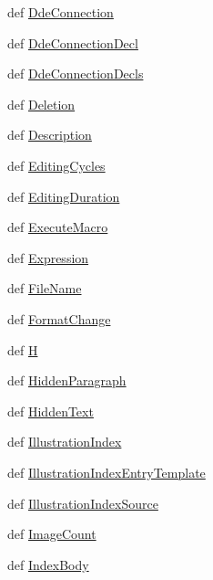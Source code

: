 \begin{DoxyCompactItemize}
\item 
def \hyperlink{namespaceodf_1_1text_abeff50d603209c35dc1520cbd65b8f38}{Dde\+Connection}
\item 
def \hyperlink{namespaceodf_1_1text_a1aa2c9df462089664933dbbe26faf718}{Dde\+Connection\+Decl}
\item 
def \hyperlink{namespaceodf_1_1text_a9f4c45586f94c7cbad71913aded59f4c}{Dde\+Connection\+Decls}
\item 
def \hyperlink{namespaceodf_1_1text_a3d7900488bee466ffb63cb99b89c0807}{Deletion}
\item 
def \hyperlink{namespaceodf_1_1text_a24217ed745fa994a16041342344309f3}{Description}
\item 
def \hyperlink{namespaceodf_1_1text_a0b5f0105d4c212782c4ac050dee2a9f6}{Editing\+Cycles}
\item 
def \hyperlink{namespaceodf_1_1text_a3d90c3a4c70ef2a85377484badf183a7}{Editing\+Duration}
\item 
def \hyperlink{namespaceodf_1_1text_ac5e553cee9726da2fd9b463ec30addf4}{Execute\+Macro}
\item 
def \hyperlink{namespaceodf_1_1text_a9c9016177c2d01a83ad146c4cdd1a2a4}{Expression}
\item 
def \hyperlink{namespaceodf_1_1text_a614362fe48f6a652b8c69974ccc74465}{File\+Name}
\item 
def \hyperlink{namespaceodf_1_1text_ad2de626ce32d98855570515da9f9550d}{Format\+Change}
\item 
def \hyperlink{namespaceodf_1_1text_a368b648972dc4472c0e4aa68e4b45ddd}{H}
\item 
def \hyperlink{namespaceodf_1_1text_a84dfa9ca075066eebff6fdf31eecb8f8}{Hidden\+Paragraph}
\item 
def \hyperlink{namespaceodf_1_1text_acc290bf984ecea4326c7f9e0b09f8b43}{Hidden\+Text}
\item 
def \hyperlink{namespaceodf_1_1text_a792f09c72d972b933da61c2bdc2fa12e}{Illustration\+Index}
\item 
def \hyperlink{namespaceodf_1_1text_a2056df2e8cffdcf48789146e093f62fd}{Illustration\+Index\+Entry\+Template}
\item 
def \hyperlink{namespaceodf_1_1text_ae8559d443d6db92e358df1bbdc6915cc}{Illustration\+Index\+Source}
\item 
def \hyperlink{namespaceodf_1_1text_a0b5295790b9ae4928ccbdceb9a8969e5}{Image\+Count}
\item 
def \hyperlink{namespaceodf_1_1text_abbdbcfad397cc0229c2e82ee458e3940}{Index\+Body}
\item 

\end{DoxyCompactItemize}
